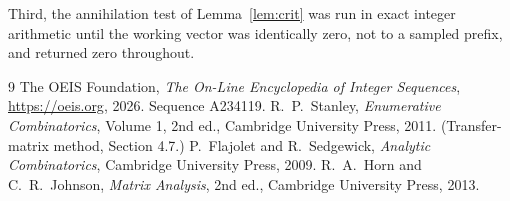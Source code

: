 \documentclass[11pt,a4paper]{article}
\theoremstyle{plain}
\theoremstyle{definition}
\begin{document}
Third, the annihilation test of Lemma~\ref{lem:crit} was run in exact integer arithmetic
until the working vector was identically zero, not to a sampled prefix, and returned zero
throughout.

\begin{thebibliography}{9}
 The OEIS Foundation, \emph{The On-Line Encyclopedia of Integer
Sequences}, \url{https://oeis.org}, 2026. Sequence A234119.
 R.~P.~Stanley, \emph{Enumerative Combinatorics}, Volume 1, 2nd ed.,
Cambridge University Press, 2011. (Transfer-matrix method, Section 4.7.)
 P.~Flajolet and R.~Sedgewick, \emph{Analytic Combinatorics}, Cambridge
University Press, 2009.
 R.~A.~Horn and C.~R.~Johnson, \emph{Matrix Analysis}, 2nd ed., Cambridge
University Press, 2013.
\end{thebibliography}
\end{document}
